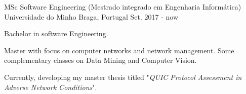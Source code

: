 

\begin{cventries}

  \cventry
  {MSc Software Engineering (Mestrado integrado em Engenharia Informática)} %
  {Universidade do Minho} %
  {Braga, Portugal} %
  {Set. 2017 - now} %
  {
    \begin{cvitems} %
      \item { Bachelor in software Engineering. }
      \item { Master with focus on computer networks and network management. Some complementary classes on Data Mining and Computer Vision. }
      \item { Currently, developing my master thesis titled "\textit{QUIC Protocol Assessment in Adverse Network Conditions}".}
    \end{cvitems}
  }

\end{cventries}